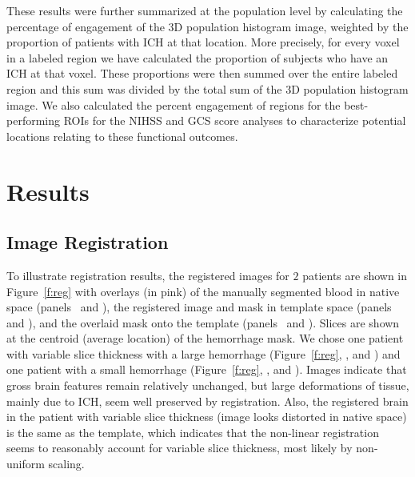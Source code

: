 \documentclass[10pt]{article}\usepackage[]{graphicx}\usepackage[]{color}
\begin{document}
These results were further summarized at the population level by calculating the percentage of engagement of the 3D population histogram image, weighted by the proportion of patients with ICH at that location.  More precisely, for every voxel in a labeled region we have calculated the proportion of subjects who have an ICH at that voxel. These proportions were then summed over the entire labeled region and this sum was divided by the total sum of the 3D population histogram image.
We also calculated the percent engagement of regions for the best-performing ROIs for the NIHSS and GCS score analyses to characterize potential locations relating to these functional outcomes.  



\section{Results}


\subsection{Image Registration}

To illustrate registration results, the registered images for $2$ patients are shown in Figure~\ref{f:reg} with overlays (in pink) of the manually segmented blood in native space (panels~\protect{} and \protect{}), the registered image and mask in template space (panels~\protect{} and \protect{}), and the overlaid mask onto the template (panels~\protect{} and \protect{}).  Slices are shown at the centroid (average location) of the hemorrhage mask.  We chose one patient with variable slice thickness with a large hemorrhage (Figure~\ref{f:reg}\protect{}, \protect{}, and \protect{}) and one patient with a small hemorrhage (Figure~\ref{f:reg}\protect{}, \protect{}, and \protect{}).  Images indicate that gross brain features remain relatively unchanged, but large deformations of tissue, mainly due to ICH, seem well preserved by registration.  Also, the registered brain in the patient with variable slice thickness (image looks distorted in native space) is the same as the template, which indicates that the non-linear registration seems to reasonably account for variable slice thickness, most likely by non-uniform scaling.
\end{document}
